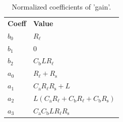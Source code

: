 \begin{table}[h]
\centering
\begin{tabular}[c]{ll}
\textbf{Coeff} & \textbf{Value} \\ 
\rowcolor{myyellow}
$b_{0}$ &$R_{\ell}$ \\ 
$b_{1}$ &$0$ \\ 
\rowcolor{myyellow}
$b_{2}$ &$C_{\mathrm{b}} L R_{\ell}$ \\ 
$a_{0}$ &$R_{\ell} + R_{\mathrm{s}}$ \\ 
\rowcolor{myyellow}
$a_{1}$ &$C_{\mathrm{a}} R_{\ell} R_{\mathrm{s}} + L$ \\ 
$a_{2}$ &$L \left(C_{\mathrm{a}} R_{\ell} + C_{\mathrm{b}} R_{\ell} + C_{\mathrm{b}} R_{\mathrm{s}}\right)$ \\ 
\rowcolor{myyellow}
$a_{3}$ &$C_{\mathrm{a}} C_{\mathrm{b}} L R_{\ell} R_{\mathrm{s}}$ \\ 
\end{tabular}
\caption{Normalized coefficients of 'gain'.}
\end{table}

